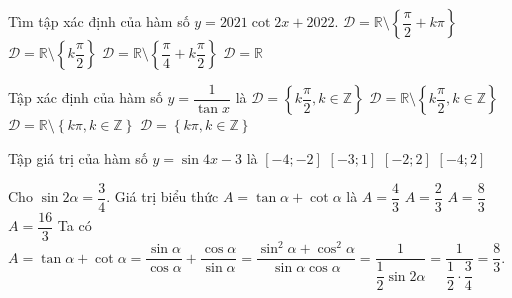 \begin{ex}%
Tìm tập xác định của hàm số $y=2021\cot 2x+2022$.
\choice
{$\mathscr{D}=\mathbb{R}\setminus\left\{\dfrac{\pi}{2}+k\pi\right\}$}
{\True $\mathscr{D}=\mathbb{R}\setminus\left\{ k\dfrac{\pi}{2}\right\}$}
{$\mathscr{D}=\mathbb{R}\setminus\left\{\dfrac{\pi}{4}+k\dfrac{\pi}{2}\right\}$}
{$\mathscr{D}=\mathbb{R}$}
\end{ex}

\begin{ex}%
Tập xác định của hàm số $y=\dfrac{1}{\tan x}$ là
\choice
{$\mathscr{D}=\left\{ k\dfrac{\pi}{2},k \in \mathbb{Z} \right\}$}
{\True $\mathscr{D}=\mathbb{R} \setminus \left\{ k\dfrac{\pi}{2},k \in \mathbb{Z} \right\}$}
{$\mathscr{D}=\mathbb{R} \setminus \left\{ k\pi,k \in \mathbb{Z} \right\}$}
{$\mathscr{D}=\left\{ k\pi,k \in \mathbb{Z} \right\}$}
\end{ex}

\begin{ex}%
Tập giá trị của hàm số $y=\sin 4 x-3$ là
\choice
{\True $[-4;-2]$}
{$[-3;1]$}
{$[-2;2]$}
{$[-4;2]$}
\end{ex}

\begin{ex}%
Cho $\sin 2\alpha=\dfrac{3}{4}$. Giá trị biểu thức $A=\tan \alpha+\cot \alpha$ là
\choice
{$A=\dfrac{4}{3}$}
{$A=\dfrac{2}{3}$}
{\True $A=\dfrac{8}{3}$}
{$A=\dfrac{16}{3}$}
\loigiai
{
Ta có $A=\tan \alpha+\cot \alpha=\dfrac{\sin \alpha}{\cos \alpha}+\dfrac{\cos \alpha}{\sin \alpha}=\dfrac{\sin ^2 \alpha+\cos ^2 \alpha}{\sin \alpha \cos \alpha}=\dfrac{1}{\dfrac{1}{2} \sin 2\alpha}=\dfrac{1}{\dfrac{1}{2} \cdot \dfrac{3}{4}}=\dfrac{8}{3}$.
}
\end{ex}

